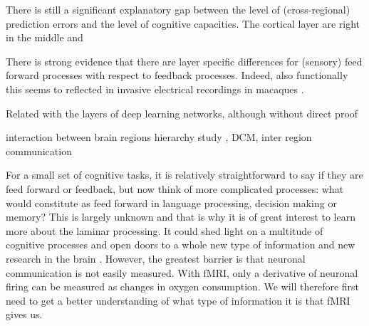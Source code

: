 There is still a significant explanatory gap between the level of (cross-regional) prediction errors and the level of cognitive capacities. The cortical layer are right in the middle and 



 There is strong evidence that there are layer specific differences for (sensory) feed forward processes with respect to feedback processes.  Indeed, also functionally this seems to reflected in invasive electrical recordings in macaques \cite{Buffalo2011,Maier2010,Maier2011,VanKerkoerle2017}. 
 
 
Related with the layers of deep learning networks, although without direct proof \cite{Guclu}
 
interaction between brain regions
hierarchy study \cite{Michalareas2016}, DCM, inter region communication






For a small set of cognitive tasks, it is relatively straightforward to say if they are feed forward or feedback, but now think of more complicated processes: what would constitute as feed forward in language processing, decision making or memory? This is largely unknown and that is why it is of great interest to learn more about the laminar processing. It could shed light on a multitude of cognitive processes and open doors to a whole new type of information and new research in the brain \cite{Lawrence2017}. However, the greatest barrier is that neuronal communication is not easily measured. With fMRI, only a derivative of neuronal firing can be measured as changes in oxygen consumption. We will therefore first need to get a better understanding of what type of information it is that fMRI gives us.

